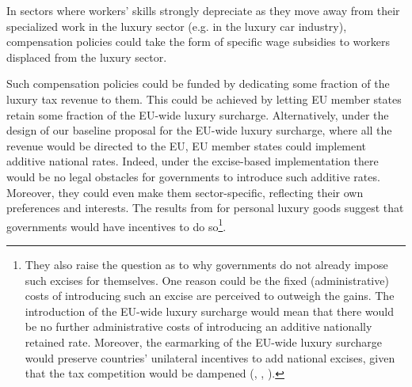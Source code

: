 \documentclass{article}
\begin{document}
In sectors where workers' skills strongly depreciate as they move away from their specialized work in the luxury sector (e.g. in the luxury car industry), compensation policies could take the form of specific wage subsidies to workers displaced from the luxury sector. 

Such compensation policies could be funded by dedicating some fraction of the luxury tax revenue to them. This could be achieved by letting EU member states retain some fraction of the EU-wide luxury surcharge. Alternatively, under the design of our baseline proposal for the EU-wide luxury surcharge, where all the revenue would be directed to the EU, EU member states could implement additive national rates. Indeed, under the excise-based implementation there would be no legal obstacles for governments to introduce such additive rates. Moreover, they could even make them sector-specific, reflecting their own preferences and interests. The results from \cite{Xie2026} for personal luxury goods suggest that governments would have incentives to do so\footnote{They also raise the question as to why governments do not already impose such excises for themselves. One reason could be the fixed (administrative) costs of introducing such an excise are perceived to outweigh the gains. The introduction of the EU-wide luxury surcharge would mean that there would be no further administrative costs of introducing an additive nationally retained rate. Moreover, the earmarking of the EU-wide luxury surcharge would preserve countries' unilateral incentives to add national excises, given that the tax competition would be dampened (\citet{KeenKotsogiannis2002}, \citet{DevereuxLockwoodRedoano2007}, \citet{BesleyRosen1998}).}. 


\end{document}
